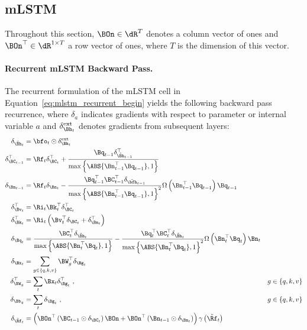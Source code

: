 \documentclass[dvipsnames]{article}
\begin{document}
\begin{appendix}
\subsection{mLSTM}
\label{sec:appmLSTM}
Throughout this section, $\BOn \in \dR^{T}$ denotes a column vector of ones and $\BOn^\top \in \dR^{1 \times T}$ a row vector of ones, where $T$ is the dimension of this vector.
\paragraph{Recurrent mLSTM Backward Pass.}
The recurrent formulation of the mLSTM cell in Equation~\ref{eq:mlstm_recurrent_begin} yields the following backward pass recurrence, where $\delta_a$ indicates gradients with respect to parameter or internal variable $a$ and $\delta^\text{ext}_{\Bh_t}$ denotes gradients from subsequent layers:
	\begin{align}
    \label{eq:mlstm_recurrent_backward}
		\delta_{\tilde{\Bh}_t} &= \bfo_t \odot \delta_{\Bh_t}^{\text{ext}} & \\
		\delta_{\BC_{t-1}}^{\top} &= \Rf_{t} \delta_{\BC_{t}}^{\top} + \frac{  \Bq_{t-1} \delta_{\tilde{\Bh}_{t-1}}^\top }{ \max \left\{ \ABS{\Bn_{t-1}^\top \Bq_{t-1}}, 1 \right\}} & \\
		\delta_{\Bn_{t-1}} &= \Rf_{t} \delta_{\Bn_{t}} - \frac{\Bq_{t-1}^\top \BC_{t-1}^\top  \delta_{\tilde{\bfh}_{t-1}}}{ \max \left\{ \ABS{\Bn_{t-1}^\top \Bq_{t-1}}, 1 \right\}^2} \Omega \left( \Bn_{t-1}^\top \Bq_{t-1} \right) \Bq_{t-1} & \\
        \delta_{\Bv_t}^{\top} &= \Ri_t \Bk_{t}^{\top} \delta_{\BC_t}^{\top} & \\
		\delta_{\Bk_t}^\top &= \Ri_t \left( \Bv_{t}^\top \delta_{\BC_t} + \delta_{\Bn_t}^\top \right) & \\
		\delta_{\Bq_t} &= \frac{\BC_t^\top \delta_{\tilde{\Bh}_t}}{ \max \left\{ \ABS{\Bn_t^\top \Bq_t}, 1 \right\}} - \frac{\Bq_t^\top \BC_t^\top \delta_{\tilde{\Bh}_t}}{ \max \left\{ \ABS{\Bn_t^\top \Bq_t}, 1 \right\}^2} \Omega \left(\Bn_t^\top \Bq_t \right) \Bn_t & \\
		\delta_{\Bx_t} &= \sum_{g \in \{q, k, v\}} \BW^\top_g \delta_{\Bg_t} & \\
		\delta_{\BW_g}^\top &= \sum_t \Bx_t \delta_{\Bg_t}^\top \ , & g \in \{q, k, v\}\\
		\delta_{\Bb_g} &= \sum_t \delta_{\Bg_t} \ , & g \in \{q, k, v\} \\
        \delta_{\tilde{\Rf}_t} &= \left( \BOn^\top \left( \BC_{t-1} \odot \delta_{\BC_{t}} \right) \BOn + \BOn^\top \left( \Bn_{t-1} \odot \delta_{\Bn_{t}} \right) \right) \gamma \left(\tilde{\Rf}_t \right) \\

\end{align}
\end{appendix}
\end{document}
